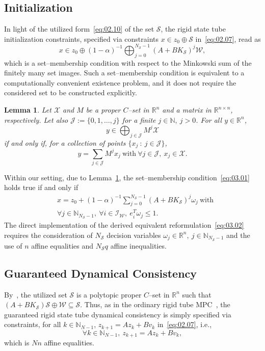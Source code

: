 \documentclass[twocolumn]{autart}
\newtheorem{lemma}{Lemma}
\newcommand{\mb}[1]{\mathbb{#1}}
\newcommand{\mc}[1]{\mathcal{#1}}
\newcommand{\N}{\mb{N}}
\newcommand{\R}{\mb{R}}
\newcommand{\Rnm}[2]{\R^{{#1}\times{#2}}}
\numberwithin{equation}{section}
\begin{document}
\subsection{Initialization}
\label{sec:03.01}
In light of the utilized form~\eqref{eq:02.10} of the set $\mc{S}$, the rigid state tube initialization constraints, specified via constraints $x\in z_0\oplus \mc{S}$ in~\eqref{eq:02.07},  read as
\begin{equation}
\label{eq:03.01}
x\in z_0\oplus (1-\alpha)^{-1}\bigoplus_{j=0}^{N_\mc{S}-1} (A+BK_\mc{S})^j\mc{W},
\end{equation}
which is a set--membership condition with respect to the Minkowski sum of the finitely many set images. Such a set--membership condition is equivalent to a computationally convenient existence problem, and it does not require the considered set to be constructed explicitly. 
\begin{lemma}
\label{lemma:03.01}
Let $\mc{X}$ and $M$ be a proper $C$--set in $\R^n$ and a matrix in $\Rnm{n}{n}$, respectively. Let also $\mc{J}:=\{0,1,\ldots,j\}$ for a finite  $j\in\N,\ j>0$. For all $y\in\R^n$,
\begin{equation*}
y\in \bigoplus_{j\in\mc{J}} M^j\mc{X}
\end{equation*}
if and only if, for a collection of points $\{x_j\ :\ j\in\mc{J}\}$, 
\begin{equation*}
y=\sum_{j\in\mc{J}} M^jx_j\ \text{with}\  \forall j\in\mc{J},\  x_j\in\mc{X}.
\end{equation*}
\end{lemma}
Within our setting, due to Lemma~\ref{lemma:03.01}, the set--membership condition~\eqref{eq:03.01} holds true if and only if
\begin{align}
&x= z_0+ (1-\alpha)^{-1}\sum_{j=0}^{N_\mc{S}-1} (A+BK_\mc{S})^j\omega_j\  \text{with}\nonumber\\
\label{eq:03.02}
&\forall j\in\N_{N_\mc{S}-1},\  \forall i\in\mc{I}_\mc{W},\  e_i^T\omega_j\le 1.
\end{align}
The direct implementation of the derived equivalent reformulation~\eqref{eq:03.02} requires the consideration of $N_\mc{S}$ decision variables $\omega_j\in\R^n,\ j\in\N_{N_\mc{S}-1}$ and the use of $n$ affine equalities and $N_\mc{S} q$ affine inequalities. 

\subsection{Guaranteed Dynamical Consistency}
\label{sec:03.03}
By~\cite[Theorem~1]{rakovic:kerrigan:kouramas:mayne:2004b}, the utilized set $\mc{S}$ is a polytopic proper $C$--set in $\R^n$ such that $(A+BK_\mc{S})\mc{S}\oplus \mc{W}\subseteq \mc{S}$. Thus, as in the ordinary rigid tube MPC~\cite{mayne:seron:rakovic:2005},  the guaranteed rigid state tube dynamical consistency is simply specified via constraints, for all $k\in\N_{N-1}$, $z_{k+1}=Az_k+Bv_k$ in~\eqref{eq:02.07}, i.e.,
\begin{equation}
\label{eq:03.03}
\forall k\in\N_{N-1},\  z_{k+1}=Az_k+Bv_k, 
\end{equation}
which is $Nn$ affine equalities.
 
\end{document}

